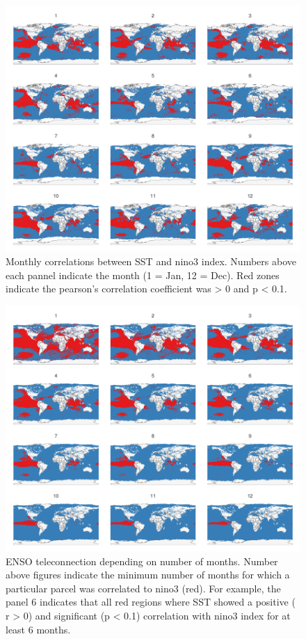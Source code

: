 \documentclass[11pt]{article}
\begin{document}
\begin{figure}
\centering
\includegraphics{img/unnamed-chunk-9-1.pdf}
\caption{Monthly correlations between SST and nino3 index. Numbers above
each pannel indicate the month (1 = Jan, 12 = Dec). Red zones indicate
the pearson's correlation coefficient was \textgreater{} 0 and p
\textless{} 0.1.}
\end{figure}

\begin{figure}
\centering
\includegraphics{img/unnamed-chunk-10-1.pdf}
\caption{ENSO teleconnection depending on number of months. Number above
figures indicate the minimum number of months for which a particular
parcel was correlated to nino3 (red). For example, the panel 6 indicates
that all red regions where SST showed a positive ( r \textgreater{} 0)
and significant (p \textless{} 0.1) correlation with nino3 index for at
least 6 months.}
\end{figure}
\end{document}
